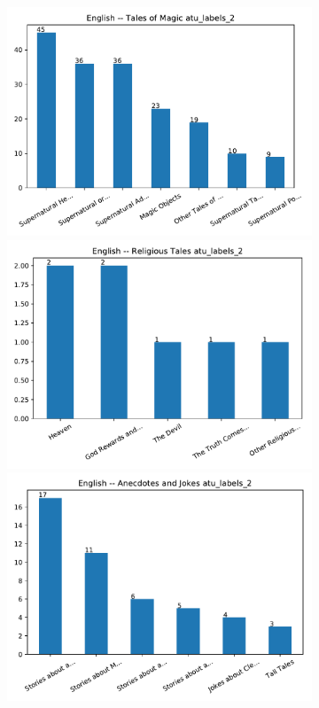 \begin{figure} \centering
\begin{subfigure}{.5\textwidth}
\centering
\includegraphics[width=0.9\linewidth]{plots/bars10.pdf}
\includegraphics[width=0.9\linewidth]{plots/bars4.pdf}
\includegraphics[width=0.9\linewidth]{plots/bars6.pdf}

\end{subfigure}
\end{figure}
